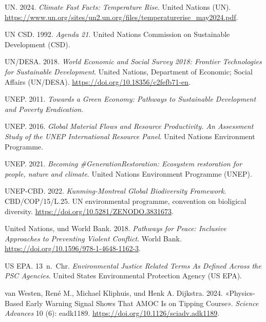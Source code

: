 \documentclass[
  nswissgerman,
  a4paper,
  DIV=11,
  numbers=noendperiod,
  oneside,
  openany]{scrreprt}
\newlength{\cslhangindent}
\newenvironment{CSLReferences}[2] %
 {\begin{list}{}{%
  \setlength{\itemindent}{0pt}
  \setlength{\leftmargin}{0pt}
  \setlength{\parsep}{0pt}
  \ifodd #1
   \setlength{\leftmargin}{\cslhangindent}
   \setlength{\itemindent}{-1\cslhangindent}
  \fi
  \setlength{\itemsep}{#2\baselineskip}}}
 {\end{list}}
\begin{document}
\begin{CSLReferences}{1}{1}
UN. 2024. \emph{Climate {Fast} {Facts}: {Temperature} {Rise}}. United
Nations (UN).
\url{https://www.un.org/sites/un2.un.org/files/temperaturerise_may2024.pdf}.

UN CSD. 1992. \emph{Agenda 21}. United Nations Commission on Sustainable
Development (CSD).

UN/DESA. 2018. \emph{World {Economic} and {Social} {Survey} 2018:
{Frontier} {Technologies} for {Sustainable} {Development}}. United
Nations, Department of Economic; Social Affairs (UN/DESA).
\url{https://doi.org/10.18356/c2fefb71-en}.

UNEP. 2011. \emph{Towards a {Green Economy}: {Pathways} to {Sustainable
Development} and {Poverty Eradication}}.

UNEP. 2016. \emph{{Global Material Flows and Resource Productivity. An
Assessment Study of the UNEP International Resource Panel}}. United
Nations Environment Programme.

UNEP. 2021. \emph{Becoming \#{GenerationRestoration}: {Ecosystem}
restoration for people, nature and climate}. United Nations Environment
Programme (UNEP).

UNEP-CBD. 2022. \emph{Kunming-{Montreal Global} Biodiversity Framework}.
CBD/COP/15/L.25. UN environmental programme, convention on bioligical
diversity. \url{https://doi.org/10.5281/ZENODO.3831673}.

United Nations, und World Bank. 2018. \emph{Pathways for {Peace}:
{Inclusive Approaches} to {Preventing Violent Conflict}}. World Bank.
\url{https://doi.org/10.1596/978-1-4648-1162-3}.

US EPA. 13~n.~Chr. \emph{Environmental {Justice Related Terms As Defined
Across} the {PSC Agencies}}. United States Environmental Protection
Agency (US EPA).

{van Westen, René M., Michael Kliphuis, und Henk A. Dijkstra}. 2024.
{«Physics-Based Early Warning Signal Shows That {AMOC} Is on Tipping
Course»}. \emph{Science Advances} 10 (6): eadk1189.
\url{https://doi.org/10.1126/sciadv.adk1189}.


\end{CSLReferences}
\end{document}
